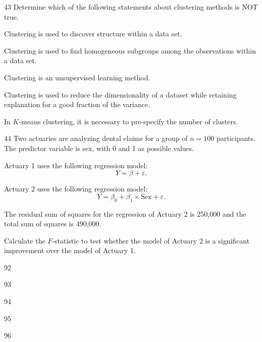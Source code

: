 \begin{question}{43}
Determine which of the following statements about clustering methods is NOT true.

\begin{choices}
\item Clustering is used to discover structure within a data set.
\item Clustering is used to find homogeneous subgroups among the observations within a data set.
\item Clustering is an unsupervised learning method.
\item Clustering is used to reduce the dimensionality of a dataset while retaining explanation for a good fraction of the variance.
\item In $K$-means clustering, it is necessary to pre-specify the number of clusters.
\end{choices}
\end{question}
\begin{question}{44}
Two actuaries are analyzing dental claims for a group of $n = 100$ participants. The predictor variable is sex, with 0 and 1 as possible values.

Actuary 1 uses the following regression model:
\[ Y = \beta + \varepsilon. \]

Actuary 2 uses the following regression model:
\[ Y = \beta_0 + \beta_1 \times \mathrm{Sex} + \varepsilon. \]

The residual sum of squares for the regression of Actuary 2 is 250,000 and the total sum of squares is 490,000.

Calculate the $F$-statistic to test whether the model of Actuary 2 is a significant improvement over the model of Actuary 1.

\begin{choices}
\item 92
\item 93
\item 94
\item 95
\item 96
\end{choices}
\end{question}

